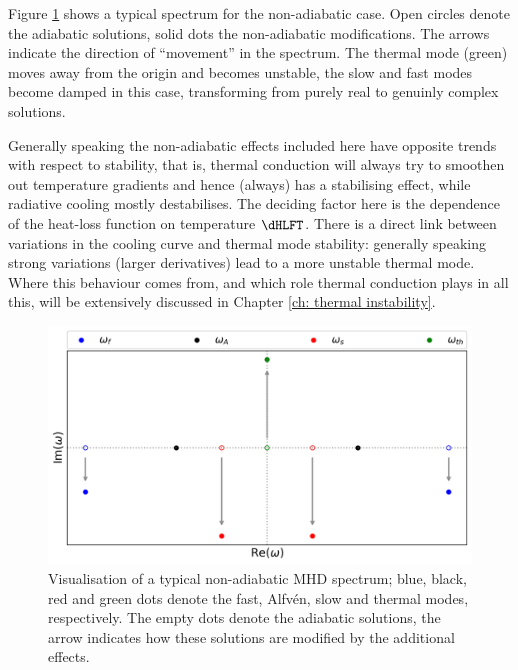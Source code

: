 Figure \ref{fig: nonadiabatic_spectrum} shows a typical spectrum for the non-adiabatic case. Open circles denote the adiabatic solutions, solid dots the non-adiabatic modifications. The arrows indicate the direction of ``movement'' in the spectrum. The thermal mode (green) moves away from the origin and becomes unstable, the slow and fast modes become damped in this case, transforming from purely real to genuinly complex solutions.

Generally speaking the non-adiabatic effects included here have opposite trends with respect to stability, that is, thermal conduction will always try to smoothen out temperature gradients and hence (always) has a stabilising effect, while radiative cooling mostly destabilises. The deciding factor here is the dependence of the heat-loss function on temperature $\dHLFT$. There is a direct link between variations in the cooling curve and thermal mode stability: generally speaking strong variations (larger derivatives) lead to a more unstable thermal mode. Where this behaviour comes from, and which role thermal conduction plays in all this, will be extensively discussed in Chapter \ref{ch: thermal instability}.

\begin{figure}[t]
  \centering
  \includegraphics[width=\textwidth]{spectrum_nonadiabatic.png}
  \caption{
    Visualisation of a typical non-adiabatic MHD spectrum; blue, black, red and green dots denote the fast, Alfv\'en, slow and thermal modes, respectively. The empty dots denote the adiabatic solutions, the arrow indicates how these solutions are modified by the additional effects.
  }
  \label{fig: nonadiabatic_spectrum}
\end{figure}


